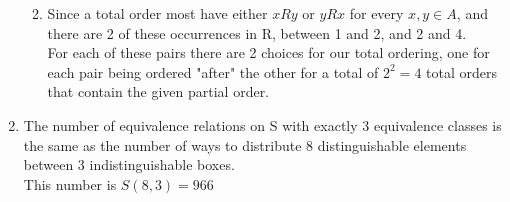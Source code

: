 \documentclass[11pt]{article}
\begin{document}
\begin{enumerate}[]
\begin{enumerate}[label=\alph*]
\begin{center}
	\end{center}
	\item Since a total order most have either $xRy$ or $yRx$ for every $x,y\in A$, and there are 2 of these occurrences in R, between 1 and 2, and 2 and 4.\\
	For each of these pairs there are 2 choices for our total ordering, one for each pair being ordered "after" the other for a total of $2^2=4$ total orders that contain the given partial order.
	\end{enumerate}
\item The number of equivalence relations on S with exactly 3 equivalence classes is the same as the number of ways to distribute 8 distinguishable elements between 3 indistinguishable boxes.\\
This number is $S(8,3)=966$
\end{enumerate}
\end{document}
